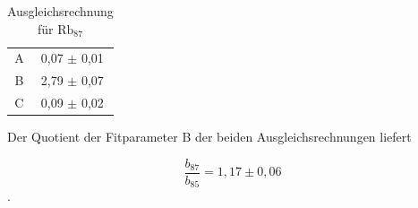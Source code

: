 \begin{table}[h!]
\centering
\begin{tabular}{cc} \toprule
\centering
A & 0,07 $\pm$ 0,01 \\
B & 2,79 $\pm$ 0,07 \\
C & 0,09 $\pm$ 0,02 \\
\bottomrule
\end{tabular}
\label{y}
\caption{Ausgleichsrechnung für $\text{Rb}_{87}$}
\end{table}

Der Quotient der Fitparameter B der beiden Ausgleichsrechnungen liefert

\begin{equation}
\frac{b_{87}}{b_{85}} = 1,17 \pm 0,06
\end{equation}
.
